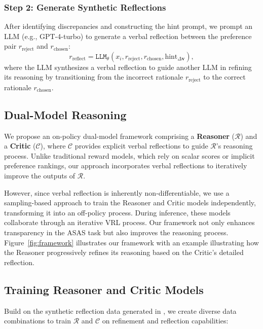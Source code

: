 \subsubsection*{Step 2: Generate Synthetic Reflections}
After identifying discrepancies and constructing the hint prompt, we prompt an LLM (e.g., GPT-4-turbo) to generate a verbal reflection between the preference pair \( r_{\text{reject}} \) and \( r_{\text{chosen}} \):
\begin{equation}
    r_{\text{reflect}} = \texttt{LLM}_{\theta}(x_i, r_{\text{reject}}, r_{\text{chosen}}, \text{hint}_{\Delta\mathbf{v}}),
    \label{eq:r_pref}
\end{equation}
where the LLM synthesizes a verbal reflection to guide another LLM in refining its reasoning by transitioning from the incorrect rationale $r_{\text{reject}}$ to the correct rationale $r_{\text{chosen}}$.
\subsection{Dual-Model Reasoning} \label{sec:reasoning_framework}
We propose an on-policy dual-model framework comprising a \textbf{Reasoner} (\(\mathcal{R}\)) and a \textbf{Critic} (\(\mathcal{C}\)), where \(\mathcal{C}\) provides explicit verbal reflections to guide \(\mathcal{R}\)’s reasoning process. Unlike traditional reward models, which rely on scalar scores or implicit preference rankings, our approach incorporates verbal reflections to iteratively improve the outputs of \(\mathcal{R}\). 

However, since verbal reflection is inherently non-differentiable, we use a sampling-based approach to train the Reasoner and Critic models independently, transforming it into an off-policy process. During inference, these models collaborate through an iterative VRL process. Our framework not only enhances transparency in the ASAS task but also improves the reasoning process. Figure~\ref{fig:framework} illustrates our framework with an example illustrating how the Reasoner progressively refines its reasoning based on the Critic’s detailed reflection.

\subsection*{Training Reasoner and Critic Models} \label{sec:training}
Build on the synthetic reflection data generated in \textsection{\ref{sec:method_data_curation}}, we create diverse data combinations to train \(\mathcal{R}\) and \(\mathcal{C}\) on refinement and reflection capabilities:


